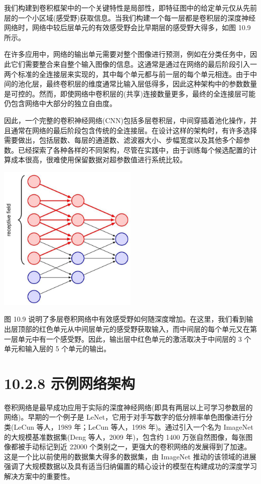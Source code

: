 \documentclass[10pt]{article}
\begin{document}
我们构建到卷积框架中的一个关键特性是局部性，即特征图中的给定单元仅从先前层的一个小区域(感受野)获取信息。当我们构建一个每一层都是卷积层的深度神经网络时，网络中较后层单元的有效感受野会比早期层的感受野大得多，如图 10.9 所示。

在许多应用中，网络的输出单元需要对整个图像进行预测，例如在分类任务中，因此它们需要整合来自整个输入图像的信息。这通常是通过在网络的最后阶段引入一两个标准的全连接层来实现的，其中每个单元都与前一层的每个单元相连。由于中间的池化层，最终卷积层的维度通常比输入层低得多，因此这种架构中的参数数量是可控的。然而，即使网络中卷积层的(共享)连接数量更多，最终的全连接层可能仍包含网络中大部分的独立自由度。

因此，一个完整的卷积神经网络(CNN)包括多层卷积层，中间穿插着池化操作，并且通常在网络的最后阶段包含传统的全连接层。在设计这样的架构时，有许多选择需要做出，包括层数、每层的通道数、滤波器大小、步幅宽度以及其他多个超参数。已经探索了各种各样的不同架构，尽管在实践中，由于训练每个候选配置的计算成本很高，很难使用保留数据对超参数值进行系统比较。

\begin{center}
\includegraphics[max width=0.5\textwidth]{images/0194e279-9b28-703a-88f4-c3ac21e2010d_318_902_341_649_682_0.jpg}
\end{center}
\hspace*{3em} 

图 10.9 说明了多层卷积网络中有效感受野如何随深度增加。在这里，我们看到输出层顶部的红色单元从中间层单元的感受野获取输入，而中间层的每个单元又在第一层单元中有一个感受野。因此，输出层中红色单元的激活取决于中间层的 3 个单元和输入层的 5 个单元的输出。

\section*{10.2.8 示例网络架构}

卷积网络是最早成功应用于实际的深度神经网络(即具有两层以上可学习参数层的网络)。早期的一个例子是 LeNet，它用于对手写数字的低分辨率单色图像进行分类(LeCun 等人，1989 年；LeCun 等人，1998 年)。通过引入一个名为 ImageNet 的大规模基准数据集(Deng 等人，2009 年)，包含约 1400 万张自然图像，每张图像都被手动标记到近 22000 个类别之一，更强大的卷积网络的发展得到了加速。这是一个比以前使用的数据集大得多的数据集，由 ImageNet 推动的该领域的进展强调了大规模数据以及具有适当归纳偏置的精心设计的模型在构建成功的深度学习解决方案中的重要性。
\end{document}
